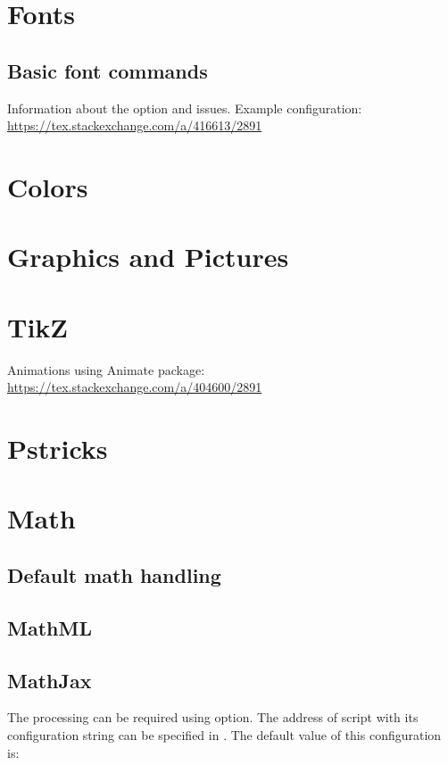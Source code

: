 \documentclass{book}
\begin{document}
\section{Fonts}
\subsection{Basic font commands}

Information about the  option and  issues. 
Example configuration:
\url{https://tex.stackexchange.com/a/416613/2891}
\section{Colors}

\section{Graphics and Pictures}


\section{TikZ }

Animations using Animate package: \url{https://tex.stackexchange.com/a/404600/2891}
\section{Pstricks}

\section{Math}
\subsection{Default math handling}
\subsection{MathML}
\subsection{MathJax}

The  processing can be required using  option.
The address of  script with its configuration string can be
specified in . The default value of this configuration is:
\end{document}
